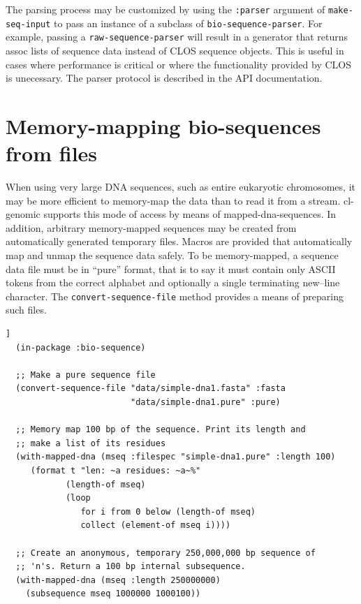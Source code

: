 \documentclass[a4paper, 12pt]{article}
\begin{document}
The parsing process may be customized by using the \lstinline!:parser!
argument of \lstinline!make-seq-input! to pass an instance of a
subclass of \lstinline!bio-sequence-parser!. For example, passing a
\lstinline!raw-sequence-parser!  will result in a generator that
returns assoc lists of sequence data instead of CLOS sequence objects.
This is useful in cases where performance is critical or where the
functionality provided by CLOS is unecessary. The parser protocol is
described in the API documentation.


\section{Memory-mapping bio-sequences from files}
\label{sec:memory-map-bioseq}

When using very large DNA sequences, such as entire eukaryotic
chromosomes, it may be more efficient to memory-map the data than to
read it from a stream. cl-genomic supports this mode of access by
means of mapped-dna-sequences. In addition, arbitrary memory-mapped
sequences may be created from automatically generated temporary
files. Macros are provided that automatically map and unmap the
sequence data safely. To be memory-mapped, a sequence data file must
be in ``pure'' format, that is to say it must contain only ASCII
tokens from the correct alphabet and optionally a single terminating
new--line character. The \lstinline!convert-sequence-file! method
provides a means of preparing such files.



\begin{lstlisting}[caption={Memory-mapping a bio-sequence},
  label=lst:memory-map-bioseq,float=[tbph]]
  (in-package :bio-sequence)

  ;; Make a pure sequence file
  (convert-sequence-file "data/simple-dna1.fasta" :fasta
                         "data/simple-dna1.pure" :pure)

  ;; Memory map 100 bp of the sequence. Print its length and
  ;; make a list of its residues
  (with-mapped-dna (mseq :filespec "simple-dna1.pure" :length 100)
     (format t "len: ~a residues: ~a~%"
            (length-of mseq)
            (loop
               for i from 0 below (length-of mseq)
               collect (element-of mseq i))))

  ;; Create an anonymous, temporary 250,000,000 bp sequence of
  ;; 'n's. Return a 100 bp internal subsequence.
  (with-mapped-dna (mseq :length 250000000)
    (subsequence mseq 1000000 1000100))
\end{lstlisting}
\end{document}

